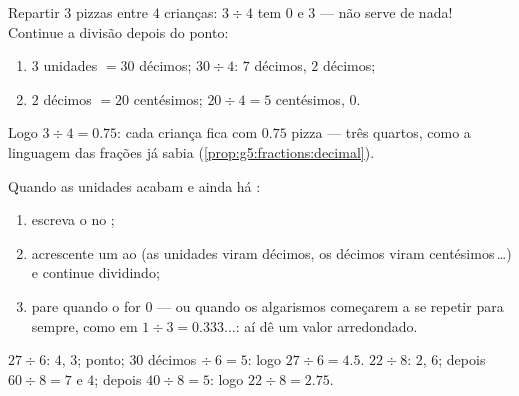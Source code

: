 \begin{example}\label{ex:g5:division:decimal}
Repartir $3$ pizzas entre $4$ crianças: $3 \div 4$ tem  $0$
e  $3$ --- não serve de nada! Continue a divisão depois do
ponto:
\begin{enumerate}
  \item $3$ unidades $= 30$ décimos; $30 \div 4$: $7$ décimos, 
        $2$ décimos;
  \item $2$ décimos $= 20$ centésimos; $20 \div 4 = 5$ centésimos,
         $0$.
\end{enumerate}
Logo $3 \div 4 = 0.75$: cada criança fica com $0.75$ pizza --- três
quartos, como a linguagem das frações já sabia
(\cref{prop:g5:fractions:decimal}).
\end{example}

\begin{method}\label{met:g5:division:continue}
Quando as unidades acabam e ainda há :
\begin{enumerate}
  \item escreva o  no ;
  \item acrescente um  ao  (as unidades viram décimos, os
        décimos viram centésimos\,\dots) e continue dividindo;
  \item pare quando o  for $0$ --- ou quando os algarismos
        começarem a se repetir para sempre, como em
        $1 \div 3 = 0.333\dots$: aí dê um valor arredondado.
\end{enumerate}
\end{method}

\begin{example}\label{ex:g5:division:continue}
$27 \div 6$:  $4$,  $3$; ponto; $30$ décimos
$\div\ 6 = 5$: logo $27 \div 6 = 4.5$. \quad
$22 \div 8$: $2$,  $6$; depois $60 \div 8 = 7$ e  $4$;
depois $40 \div 8 = 5$: logo $22 \div 8 = 2.75$.
\end{example}

